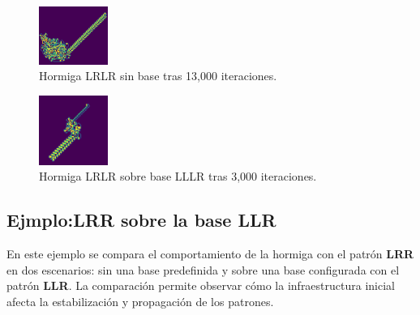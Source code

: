 \documentclass[twocolumn]{article}
\begin{document}
\begin{figure}[h!]
    \centering
    \includegraphics[width=0.2\textwidth]{reportTemplate/figures/lrlr_sin_base.png}
    \caption{Hormiga LRLR sin base tras 13,000 iteraciones.}
    \label{fig:lrlr_sin_base}
\end{figure}

\begin{figure}[h!]
    \centering
    \includegraphics[width=0.2\textwidth]{reportTemplate/figures/lrlr_13000.png}
    \caption{Hormiga LRLR sobre base LLLR tras 3,000 iteraciones.}
    \label{fig:lrlr_13000}
\end{figure}





\subsection{Ejmplo:LRR sobre la base LLR}

En este ejemplo se compara el comportamiento de la hormiga con el patrón \textbf{LRR} en dos escenarios: sin una base predefinida y sobre una base configurada con el patrón \textbf{LLR}. La comparación permite observar cómo la infraestructura inicial afecta la estabilización y propagación de los patrones.
\end{document}
